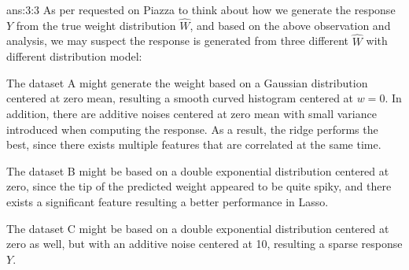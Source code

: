 \documentclass{tron}
\begin{document}
\begin{answer}[]{ans:3:3}
As per requested on Piazza to think about how we generate the response $Y$ from the true weight distribution $\hat{W}$, and based on the above observation and analysis, we may suspect the response is generated from three different $\hat{W}$ with different distribution model:

The dataset A might generate the weight based on a Gaussian distribution centered at zero mean, resulting a smooth curved histogram centered at $w=0$. In addition, there are additive noises centered at zero mean with small variance introduced when computing the response. As a result, the ridge performs the best, since there exists multiple features that are correlated at the same time. 

The dataset B might be based on a double exponential distribution centered at zero, since the tip of the predicted weight appeared to be quite spiky, and there exists a significant feature resulting a better performance in Lasso.

The dataset C might be based on a double exponential distribution centered at zero as well, but with an additive noise centered at 10, resulting a sparse response $Y$.
\end{answer}
\end{document}
